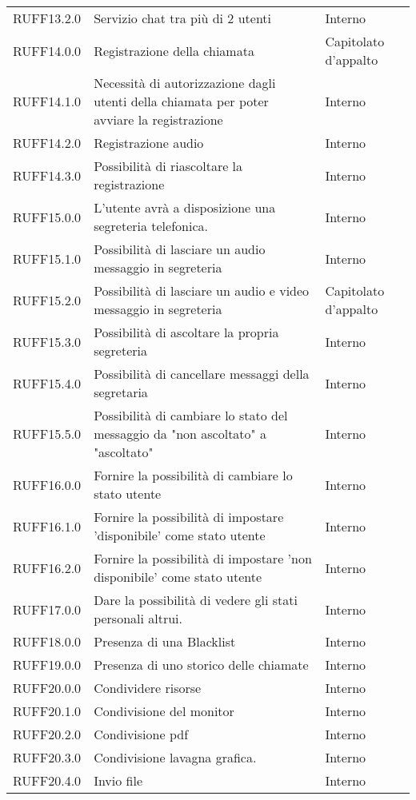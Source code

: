 \begin{center}
\begin{longtable}{lp{}l}
RUFF13.2.0 & Servizio chat tra più di 2 utenti & Interno \\
RUFF14.0.0 & Registrazione della chiamata & Capitolato d'appalto \\
RUFF14.1.0 & Necessità di autorizzazione dagli utenti della chiamata per poter avviare la registrazione & Interno \\
RUFF14.2.0 & Registrazione audio & Interno \\
RUFF14.3.0 & Possibilità di riascoltare la registrazione & Interno \\
RUFF15.0.0 & L'utente avrà a disposizione una segreteria telefonica. & Interno \\
RUFF15.1.0 & Possibilità di lasciare un audio messaggio in segreteria & Interno \\
RUFF15.2.0 & Possibilità di lasciare un audio e video messaggio in segreteria & Capitolato d'appalto \\
RUFF15.3.0 & Possibilità di ascoltare la propria segreteria & Interno \\
RUFF15.4.0 & Possibilità di cancellare messaggi della segretaria & Interno \\
RUFF15.5.0 & Possibilità di cambiare lo stato del messaggio da "non ascoltato" a "ascoltato" & Interno \\
RUFF16.0.0 & Fornire la possibilità di cambiare lo stato utente & Interno \\
RUFF16.1.0  & Fornire la possibilità di impostare 'disponibile' come stato utente & Interno \\
RUFF16.2.0 & Fornire la possibilità di impostare 'non disponibile' come stato utente & Interno \\
RUFF17.0.0 & Dare la possibilità di vedere gli stati personali altrui. & Interno \\
RUFF18.0.0 & Presenza di una Blacklist & Interno \\
RUFF19.0.0 & Presenza di uno storico delle chiamate & Interno \\
RUFF20.0.0 & Condividere risorse & Interno \\
RUFF20.1.0 & Condivisione del monitor & Interno \\
RUFF20.2.0 & Condivisione pdf & Interno \\
RUFF20.3.0 & Condivisione lavagna grafica. & Interno \\
RUFF20.4.0 & Invio file & Interno \\
\bottomrule
\end{longtable}
\end{center}

